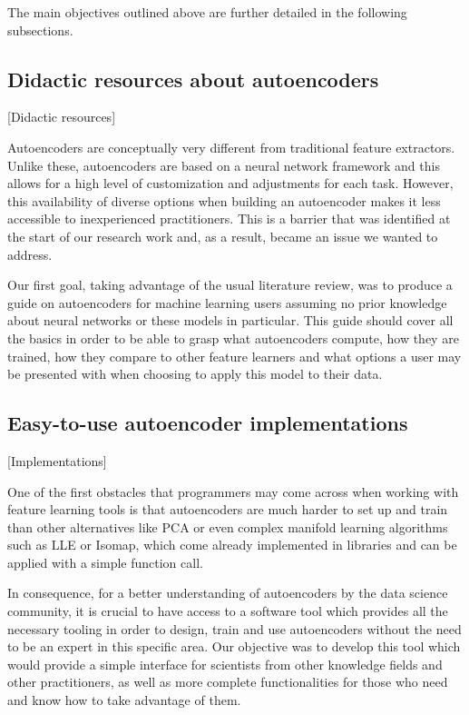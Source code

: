 The main objectives outlined above are further detailed in the following subsections.

\subsection{Didactic resources about autoencoders}[Didactic resources]\label{ss:didactic}

Autoencoders are conceptually very different from traditional feature extractors. Unlike these, autoencoders are based on a neural network framework and this allows for a high level of customization and adjustments for each task. However, this availability of diverse options when building an autoencoder makes it less accessible to inexperienced practitioners. This is a barrier that was identified at the start of our research work and, as a result, became an issue we wanted to address.

Our first goal, taking advantage of the usual literature review, was to produce a guide on autoencoders for machine learning users assuming no prior knowledge about neural networks or these models in particular. This guide should cover all the basics in order to be able to grasp what autoencoders compute, how they are trained, how they compare to other feature learners and what options a user may be presented with when choosing to apply this model to their data.


\subsection{Easy-to-use autoencoder implementations}[Implementations]\label{ss:implementations}

One of the first obstacles that programmers may come across when working with feature learning tools is that autoencoders are much harder to set up and train than other alternatives like PCA or even complex manifold learning algorithms such as LLE or Isomap, which come already implemented in libraries and can be applied with a simple function call.

In consequence, for a better understanding of autoencoders by the data science community, it is crucial to have access to a software tool which provides all the necessary tooling in order to design, train and use autoencoders without the need to be an expert in this specific area. Our objective was to develop this tool which would provide a simple interface for scientists from other knowledge fields and other practitioners, as well as more complete functionalities for those who need and know how to take advantage of them.

